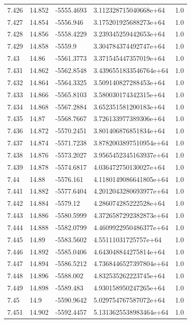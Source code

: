 \begin{tabular}{lllll}
7.426 & 14.852 & -5555.4693 & 3.112328715040668e+64 & 1.0 \\
7.427 & 14.854 & -5556.946 & 3.175201925688273e+64 & 1.0 \\
7.428 & 14.856 & -5558.4229 & 3.239345259442653e+64 & 1.0 \\
7.429 & 14.858 & -5559.9 & 3.304784374492747e+64 & 1.0 \\
7.43 & 14.86 & -5561.3773 & 3.371545447357019e+64 & 1.0 \\
7.431 & 14.862 & -5562.8548 & 3.4396551833546764e+64 & 1.0 \\
7.432 & 14.864 & -5564.3325 & 3.509140827288453e+64 & 1.0 \\
7.433 & 14.866 & -5565.8103 & 3.580030174342315e+64 & 1.0 \\
7.434 & 14.868 & -5567.2884 & 3.652351581200183e+64 & 1.0 \\
7.435 & 14.87 & -5568.7667 & 3.726133977389306e+64 & 1.0 \\
7.436 & 14.872 & -5570.2451 & 3.801406876851834e+64 & 1.0 \\
7.437 & 14.874 & -5571.7238 & 3.8782003897510954e+64 & 1.0 \\
7.438 & 14.876 & -5573.2027 & 3.9565452345163937e+64 & 1.0 \\
7.439 & 14.878 & -5574.6817 & 4.036472750130027e+64 & 1.0 \\
7.44 & 14.88 & -5576.161 & 4.1180149086641805e+64 & 1.0 \\
7.441 & 14.882 & -5577.6404 & 4.2012043280693977e+64 & 1.0 \\
7.442 & 14.884 & -5579.12 & 4.286074285222528e+64 & 1.0 \\
7.443 & 14.886 & -5580.5999 & 4.3726587292382873e+64 & 1.0 \\
7.444 & 14.888 & -5582.0799 & 4.4609922950486377e+64 & 1.0 \\
7.445 & 14.89 & -5583.5602 & 4.55111031725757e+64 & 1.0 \\
7.446 & 14.892 & -5585.0406 & 4.643048844275814e+64 & 1.0 \\
7.447 & 14.894 & -5586.5212 & 4.7368446527397804e+64 & 1.0 \\
7.448 & 14.896 & -5588.002 & 4.832535262223745e+64 & 1.0 \\
7.449 & 14.898 & -5589.483 & 4.930158950247265e+64 & 1.0 \\
7.45 & 14.9 & -5590.9642 & 5.029754767587072e+64 & 1.0 \\
7.451 & 14.902 & -5592.4457 & 5.1313625538983464e+64 & 1.0 \\

\end{tabular}
